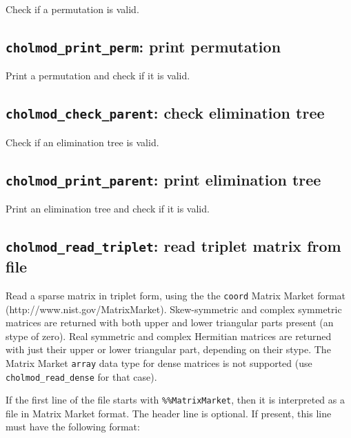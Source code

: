 \documentclass[11pt]{article}
\begin{document}

Check if a permutation is valid.

\subsection{{\tt cholmod\_print\_perm}: print permutation}


Print a permutation and check if it is valid.

\newpage \subsection{{\tt cholmod\_check\_parent}: check elimination tree}


Check if an elimination tree is valid.

\subsection{{\tt cholmod\_print\_parent}: print elimination tree}


Print an elimination tree and check if it is valid.

\newpage \subsection{{\tt cholmod\_read\_triplet}: read triplet matrix from file}


Read a sparse matrix in triplet form, using the the {\tt coord} 
Matrix Market format (http://www.nist.gov/MatrixMarket).
Skew-symmetric and complex symmetric matrices are returned with
both upper and lower triangular parts present (an stype of zero).
Real symmetric and complex Hermitian matrices are returned with just
their upper or lower triangular part, depending on their stype.
The Matrix Market {\tt array} data type for dense matrices is not supported
(use {\tt cholmod\_read\_dense} for that case).

If the first line of the file starts with {\tt \%\%MatrixMarket}, then it is
interpreted as a file in Matrix Market format.  The header line is optional.
If present, this line must have the following format:
\vspace{0.1in}
\end{document}
